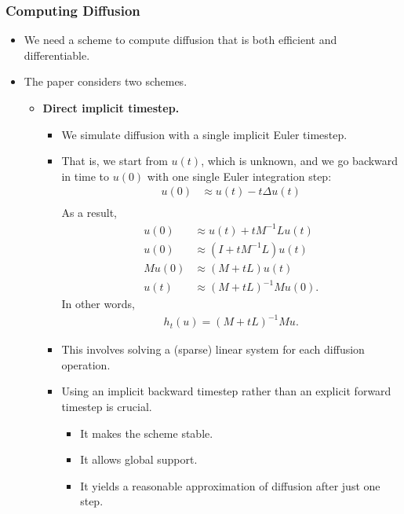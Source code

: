 \documentclass[10pt]{article}
\begin{document}
\subsubsection{Computing Diffusion}

\begin{itemize}
    \item We need a scheme to compute diffusion that is both efficient and differentiable.
    
    \item The paper considers two schemes.

    \begin{itemize}
        \item {\bf Direct implicit timestep.}
        \begin{itemize}
            \item We simulate diffusion with a single implicit Euler timestep. 
            
            \item That is, we start from $u(t)$, which is unknown, and we go backward in time to $u(0)$ with one single Euler integration step:
            \begin{align*}
                u(0) &\approx u(t) - t \Delta u(t) \\
            \end{align*}
            As a result,
            \begin{align*}
                u(0) &\approx u(t) + t M^{-1} L u(t) \\
                u(0) &\approx (I + t M^{-1} L) u(t) \\
                M u(0) &\approx (M+ t L) u(t) \\
                u(t) &\approx (M + t L)^{-1} M u(0).
            \end{align*}            
            In other words,
            \begin{align*}
                h_t(u) = (M + tL)^{-1} M u.
            \end{align*}

            \item This involves solving a (sparse) linear system for each diffusion operation.
            
            \item Using an implicit backward timestep rather than an explicit forward timestep is crucial. 
            \begin{itemize}
                \item It makes the scheme stable.
                \item It allows global support.
                \item It yields a reasonable approximation of diffusion after just one step.
            \end{itemize}
        \end{itemize}


\end{itemize}
\end{itemize}
\end{document}
